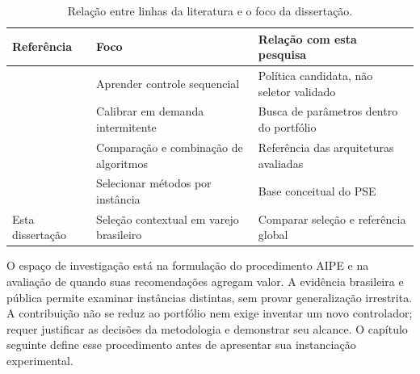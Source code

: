 \begin{table}[htb]
\centering\small
\caption{Relação entre linhas da literatura e o foco da dissertação.}
\label{tab:relwork_intro}
\begin{tabular}{@{}p{4.2cm}p{4.4cm}p{4.5cm}@{}}
\toprule
Referência & Foco & Relação com esta pesquisa\\
\midrule
\citealt{Oroojlooyjadid2022BeerGameDQN} & Aprender controle sequencial & Política candidata, não seletor validado\\
\citealt{Yuna2023IntermittentMetaheuristics} & Calibrar em demanda intermitente & Busca de parâmetros dentro do portfólio\\
\citealt{Zabraoui2025GaDQN} & Comparação e combinação de algoritmos & Referência das arquiteturas avaliadas\\
\citealt{Rice1976AlgorithmSelection,Kotthoff2014AlgorithmSelection} & Selecionar métodos por instância & Base conceitual do PSE\\
Esta dissertação & Seleção contextual em varejo brasileiro & Comparar seleção e referência global\\
\bottomrule
\end{tabular}
\end{table}

O espaço de investigação está na formulação do procedimento AIPE e na avaliação de quando suas recomendações agregam valor. A evidência brasileira e pública permite examinar instâncias distintas, sem provar generalização irrestrita. A contribuição não se reduz ao portfólio nem exige inventar um novo controlador; requer justificar as decisões da metodologia e demonstrar seu alcance. O capítulo seguinte define esse procedimento antes de apresentar sua instanciação experimental.
